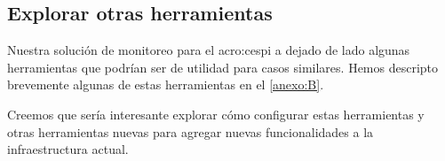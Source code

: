 \subsection{Explorar otras herramientas}
\label{explorar-otras-herramientas}

Nuestra solución de monitoreo para el \gls{acro:cespi} a dejado de lado algunas
herramientas que podrían ser de utilidad para casos similares. Hemos descripto
brevemente algunas de estas herramientas en el \autoref{anexo:B}.

Creemos que sería interesante explorar cómo configurar estas herramientas y
otras herramientas nuevas para agregar nuevas funcionalidades a la
infraestructura actual.
